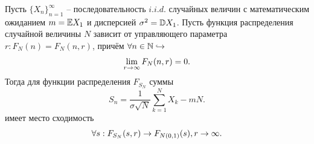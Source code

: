 \begin{theorem}
    Пусть $\{X_n\}_{n = 1}^\infty$ -- последовательность $i.i.d.$ случайных величин с математическим ожиданием $m = \mathbb{E} X_1$ и дисперсией $\sigma^2 = \mathbb{D} X_1$. Пусть функция распределения случайной величины $N$ зависит от управляющего параметра $r: F_N(n) = F_N(n, r)$, причём $\forall n \in \mathbb{N} \hookrightarrow$
    \[
        \lim\limits_{r \rightarrow \infty} F_N(n, r) = 0.
    \]
    Тогда для функции распределения $F_{S_N}$ суммы
    \[
        S_n = \dfrac{1}{\sigma\sqrt{N}}\sum\limits_{k = 1}^N X_k - mN.
    \]
    имеет место сходимость 
    \[
        \forall s: F_{S_N}(s, r) \rightarrow F_{N(0, 1)}(s), r \rightarrow \infty.
    \]
\end{theorem}

